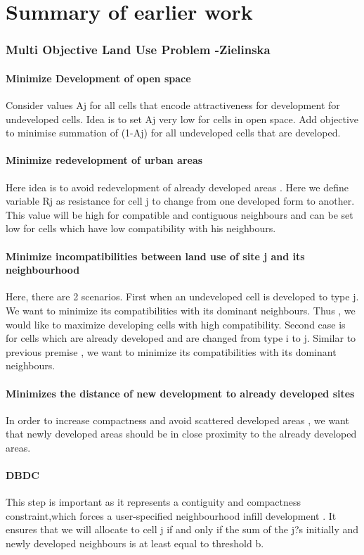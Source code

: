 \documentclass[twoside,10pt]{article}
\begin{document}
\section{Summary of earlier work}

\subsubsection{Multi Objective Land Use Problem -Zielinska}

\paragraph*{Minimize Development of open space} Consider values Aj  for all cells that encode attractiveness for development for undeveloped cells. Idea is to set Aj very low for cells in open space. Add objective to minimise summation of (1-Aj) for all undeveloped cells that are developed. 
\paragraph*{Minimize redevelopment of urban areas}  Here idea is to avoid redevelopment of already developed areas . Here we define variable Rj as resistance for cell j to change from one developed form to another. This value will be high for compatible and contiguous neighbours and can be set low for cells which have low compatibility with his neighbours.
\paragraph*{Minimize incompatibilities between land use of site j and its neighbourhood } Here, there are 2 scenarios. First when an undeveloped cell is developed to type j. We want to minimize its compatibilities with its dominant neighbours. Thus , we would like to maximize developing cells with high compatibility. Second case is for  cells which are already developed and are changed from type i to j. Similar to previous premise , we want  to minimize its compatibilities with its dominant neighbours. 
\paragraph*{Minimizes the distance of new development to already developed sites } In order to increase compactness and avoid scattered developed areas , we want that newly developed areas should be in close proximity to the already developed areas.
\paragraph*{DBDC}
This step is important as it represents a contiguity and compactness constraint,which forces a user-specified neighbourhood infill development . It ensures that we will allocate to cell j if and only if the sum of the j?s initially and newly developed neighbours is at least equal to threshold b.\\[.25cm]
\end{document}
